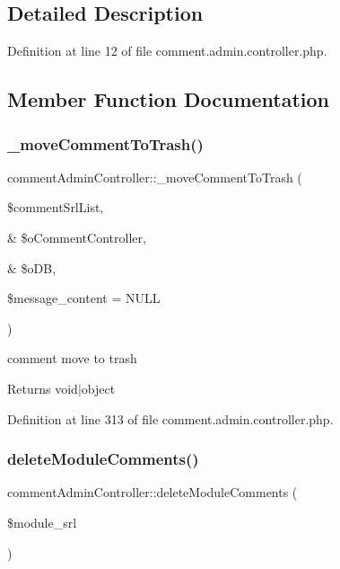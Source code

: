 \subsection{Detailed Description}


Definition at line 12 of file comment.\+admin.\+controller.\+php.



\subsection{Member Function Documentation}
\hypertarget{classcommentAdminController_a2ac42957d98a26a13576e174ec5fc4e6}{}\label{classcommentAdminController_a2ac42957d98a26a13576e174ec5fc4e6} 
\subsubsection{\texorpdfstring{\+\_\+move\+Comment\+To\+Trash()}{\_moveCommentToTrash()}}
{\footnotesize\ttfamily comment\+Admin\+Controller\+::\+\_\+move\+Comment\+To\+Trash (\begin{DoxyParamCaption}\item[{}]{\$comment\+Srl\+List,  }\item[{\&}]{\$o\+Comment\+Controller,  }\item[{\&}]{\$o\+DB,  }\item[{}]{\$message\+\_\+content = {\ttfamily NULL} }\end{DoxyParamCaption})}

comment move to trash \begin{DoxyReturn}{Returns}
void$\vert$object 
\end{DoxyReturn}


Definition at line 313 of file comment.\+admin.\+controller.\+php.

\hypertarget{classcommentAdminController_a72c265be53cc3b664cd0702a568bc05f}{}\label{classcommentAdminController_a72c265be53cc3b664cd0702a568bc05f} 
\subsubsection{\texorpdfstring{delete\+Module\+Comments()}{deleteModuleComments()}}
{\footnotesize\ttfamily comment\+Admin\+Controller\+::delete\+Module\+Comments (\begin{DoxyParamCaption}\item[{}]{\$module\+\_\+srl }\end{DoxyParamCaption})}

